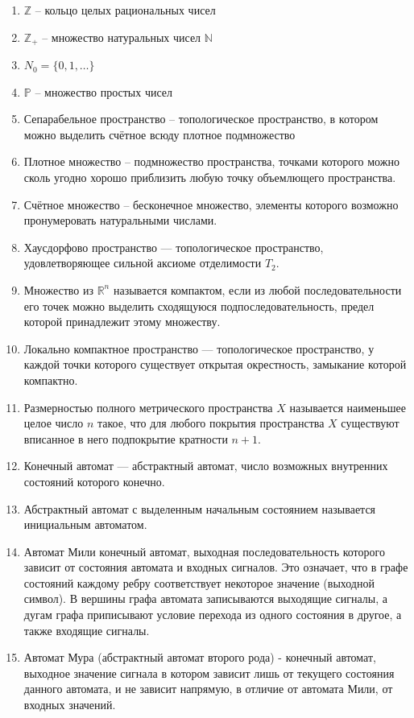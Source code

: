 \documentclass[och, master]{SCWorks}
\author{Sharov Alex}
\theoremstyle{plain}
\theoremstyle{plain}
\theoremstyle{plain}
\theoremstyle{definition}
\begin{document}
%
\setcounter{tocdepth}{2}

\tableofcontents


\begin{enumerate}
	\item $\mathbb {Z}$ -- кольцо целых рациональных чисел
	\item $\mathbb {Z}_{+}$ -- множество натуральных чисел $\mathbb {N}$
	\item ${N}_0=\{0,1,\dots\}$
	\item $\mathbb {P}$ -- множество простых чисел
	\item Сепарабельное пространство -- топологическое пространство, в котором можно выделить счётное всюду плотное подмножество
	\item Плотное множество -- подмножество пространства, точками которого можно сколь угодно хорошо приблизить любую точку объемлющего пространства.
	\item Счётное множество -- бесконечное множество, элементы которого возможно пронумеровать натуральными числами.
	\item Хаусдорфово пространство — топологическое пространство, удовлетворяющее сильной аксиоме отделимости $T_2$.
	\item Множество из $\mathbb {R}^n$ называется компактом, если из любой последовательности его точек можно выделить сходящуюся подпоследовательность, предел которой принадлежит этому множеству.
	\item Локально компактное пространство — топологическое пространство, у каждой точки которого существует открытая окрестность, замыкание которой компактно.
	\item Размерностью полного метрического пространства $X$ называется наименьшее целое число $n$ такое, что для любого покрытия пространства $X$ существуют вписанное в него подпокрытие кратности $n+1$.
	\item Конечный автомат — абстрактный автомат, число возможных внутренних состояний которого конечно.
	\item Абстрактный автомат с выделенным начальным состоянием называется инициальным автоматом. \cite{bib:automata:elements}
	\item Автомат Мили конечный автомат, выходная последовательность которого зависит от состояния автомата и входных сигналов. Это означает, что в графе состояний каждому ребру соответствует некоторое значение (выходной символ). В вершины графа автомата записываются выходящие сигналы, а дугам графа приписывают условие перехода из одного состояния в другое, а также входящие сигналы. \cite{bib:automata:elements}
	\item Автомат Мура (абстрактный автомат второго рода) - конечный автомат, выходное значение сигнала в котором зависит лишь от текущего состояния данного автомата, и не зависит напрямую, в отличие от автомата Мили, от входных значений. \cite{bib:automata:elements}
	
\end{enumerate}
\end{document}
